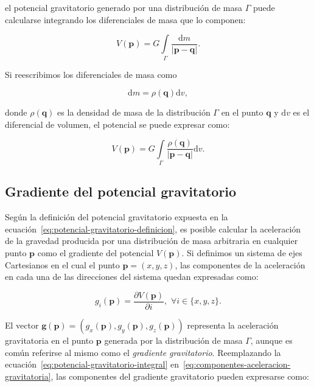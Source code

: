 \noindent el potencial gravitatorio generado por una distribución de masa
$\Gamma$ puede calcularse integrando los diferenciales de masa que lo componen:

\begin{equation}
    V(\mathbf{p}) =
        G \int\limits_\Gamma \frac{\text{d}m}{|\mathbf{p} - \mathbf{q}|} .
\end{equation}

Si reescribimos los diferenciales de masa como

\begin{equation}
    \text{d}m = \rho(\mathbf{q}) \text{d}v,
\end{equation}

\noindent donde $\rho(\mathbf{q})$ es la densidad de masa de la distribución
$\Gamma$ en el punto $\mathbf{q}$ y $\text{d}v$ es el diferencial de volumen,
el potencial se puede expresar como:

\begin{equation}
    V(\mathbf{p}) =
        G \int\limits_\Gamma
        \frac{\rho(\mathbf{q})}{|\mathbf{p} - \mathbf{q}|} \text{d}v.
    \label{eq:potencial-gravitatorio-integral}
\end{equation}


\subsection{Gradiente del potencial gravitatorio}

Según la definición del potencial gravitatorio expuesta en la
ecuación~\ref{eq:potencial-gravitatorio-definicion}, es posible calcular la
aceleración de la gravedad producida por una distribución de masa arbitraria
en cualquier punto $\mathbf{p}$ como el gradiente del potencial
$V(\mathbf{p})$.
Si definimos un sistema de ejes Cartesianos en el cual el punto $\mathbf{p}
= (x, y, z)$, las componentes de la aceleración en cada una de las direcciones
del sistema quedan expresadas
como:

\begin{equation}
    g_i(\mathbf{p}) = \frac{\partial V(\mathbf{p})}{\partial i}, \,\,
        \forall i \in \{x, y, z\}.
    \label{eq:componentes-aceleracion-gravitatoria}
\end{equation}

El vector
$\mathbf{g}(\mathbf{p}) = (g_x(\mathbf{p}), g_y(\mathbf{p}), g_z(\mathbf{p}))$
representa la aceleración gravitatoria en el punto
$\mathbf{p}$ generada por la distribución de masa $\Gamma$, aunque es común
referirse al mismo como el \emph{gradiente gravitatorio}.
Reemplazando la ecuación~\ref{eq:potencial-gravitatorio-integral}
en~\ref{eq:componentes-aceleracion-gravitatoria}, las componentes del gradiente
gravitatorio pueden expresarse como:

